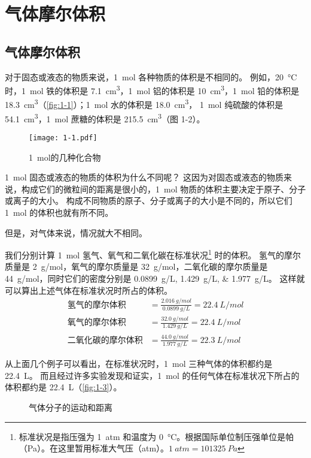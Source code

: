 \section{气体摩尔体积}
\subsection{气体摩尔体积}
对于固态或液态的物质来说，\qty{1}{mol} 各种物质的体积是不相同的。
例如，\qty{20}{\celsius} 时，\qty{1}{mol} 铁的体积是 \qty{7.1}{cm^3}，\qty{1}{mol} 铝的体积是 \qty{10}{cm^3}，\qty{1}{mol} 铅的体积是 \qty{18.3}{cm^3}（\cref{fig:1-1}）；\qty{1}{mol} 水的体积是 \qty{18.0}{cm^3}， \qty{1}{mol} 纯硫酸的体积是 \qty{54.1}{cm^3}，\qty{1}{mol} 蔗糖的体积是 \qty{215.5}{cm^3}（图 1-2）。
\begin{figure}
  \texttt{[image: 1-1.pdf]}
  \caption{\qty{1}{mol}的几种金属}\label{fig:1-1}
  \caption{\qty{1}{mol}的几种化合物}\label{fig:1-2}
\end{figure}

\qty{1}{mol} 固态或液态的物质的体积为什么不同呢？ 
这因为对固态或液态的物质来说，构成它们的微粒间的距离是很小的，\qty{1}{mol} 物质的体积主要决定于原子、分子或离子的大小。
构成不同物质的原子、分子或离子的大小是不同的，所以它们 \qty{1}{mol} 的体积也就有所不同。

但是，对气体来说，情况就大不相同。

我们分别计算 \qty{1}{mol} 氢气、氧气和二氧化碳在标准状况\footnote{标准状况是指压强为 \qty{1}{atm} 和温度为 \qty{0}{\celsius}。根据国际单位制压强单位是帕（\unit{Pa}）。在这里暂用标准大气压（\unit{atm}）。$\qty{1}{atm}=\qty{101325}{Pa}$} 时的体积。
氢气的摩尔质量是 \qty{2}{g/mol}，氧气的摩尔质量是 \qty{32}{g/mol}，二氧化碳的摩尔质量是 \qty{44}{g/mol}，同时它们的密度分别是 \qtylist{0.0899;1.429;1.977}{g/L}。
这样就可以算出上述气体在标准状况时所占的体积。
\begin{align*}
  \text{氢气的摩尔体积}&=\frac{\qty{2.016}{g/mol}}{\qty{0.0899}{g/L}}=\qty{22.4}{L/mol}\\
  \text{氧气的摩尔体积}&=\frac{\qty{32.0}{g/mol}}{\qty{1.429}{g/L}}=\qty{22.4}{L/mol}\\
  \text{二氧化碳的摩尔体积}&=\frac{\qty{44.0}{g/mol}}{\qty{1.977}{g/L}}=\qty{22.3}{L/mol}
\end{align*}

从上面几个例子可以看出，在标准状况时，\qty{1}{mol} 三种气体的体积都约是 \qty{22.4}{L}。
而且经过许多实验发现和证实，\qty{1}{mol} 的任何气体在标准状况下所占的体积都约是 \qty{22.4}{L}（\cref{fig:1-3}）。
\begin{figure}
  \begin{minipage}{0.48\linewidth}\centering
    \caption{气体摩尔体积}\label{fig:1-3}
  \end{minipage}
  \begin{minipage}{0.48\linewidth}\centering
    \caption{气体分子的运动和距离}\label{fig:1-4}
  \end{minipage}
\end{figure}

